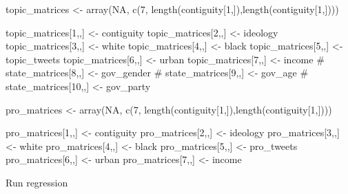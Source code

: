 \documentclass[
  letterpaper,
  DIV=11,
  numbers=noendperiod]{scrartcl}
\newenvironment{Shaded}{\begin{snugshade}}{\end{snugshade}}
\newcommand{\CommentTok}[1]{\textcolor[rgb]{0.37,0.37,0.37}{#1}}
\newcommand{\ConstantTok}[1]{\textcolor[rgb]{0.56,0.35,0.01}{#1}}
\newcommand{\DecValTok}[1]{\textcolor[rgb]{0.68,0.00,0.00}{#1}}
\newcommand{\FunctionTok}[1]{\textcolor[rgb]{0.28,0.35,0.67}{#1}}
\newcommand{\NormalTok}[1]{\textcolor[rgb]{0.00,0.23,0.31}{#1}}
\newcommand{\OtherTok}[1]{\textcolor[rgb]{0.00,0.23,0.31}{#1}}
\begin{document}
\begin{Shaded}
\begin{Highlighting}[]
\NormalTok{topic\_matrices }\OtherTok{\textless{}{-}} \FunctionTok{array}\NormalTok{(}\ConstantTok{NA}\NormalTok{, }\FunctionTok{c}\NormalTok{(}\DecValTok{7}\NormalTok{, }\FunctionTok{length}\NormalTok{(contiguity[}\DecValTok{1}\NormalTok{,]),}\FunctionTok{length}\NormalTok{(contiguity[}\DecValTok{1}\NormalTok{,]))) }


\NormalTok{topic\_matrices[}\DecValTok{1}\NormalTok{,,] }\OtherTok{\textless{}{-}}\NormalTok{ contiguity}
\NormalTok{topic\_matrices[}\DecValTok{2}\NormalTok{,,] }\OtherTok{\textless{}{-}}\NormalTok{ ideology}
\NormalTok{topic\_matrices[}\DecValTok{3}\NormalTok{,,] }\OtherTok{\textless{}{-}}\NormalTok{ white}
\NormalTok{topic\_matrices[}\DecValTok{4}\NormalTok{,,] }\OtherTok{\textless{}{-}}\NormalTok{ black}
\NormalTok{topic\_matrices[}\DecValTok{5}\NormalTok{,,] }\OtherTok{\textless{}{-}}\NormalTok{ topic\_tweets}
\NormalTok{topic\_matrices[}\DecValTok{6}\NormalTok{,,] }\OtherTok{\textless{}{-}}\NormalTok{ urban}
\NormalTok{topic\_matrices[}\DecValTok{7}\NormalTok{,,] }\OtherTok{\textless{}{-}}\NormalTok{ income}
\CommentTok{\# state\_matrices[8,,] \textless{}{-} gov\_gender}
\CommentTok{\# state\_matrices[9,,] \textless{}{-} gov\_age}
\CommentTok{\# state\_matrices[10,,] \textless{}{-} gov\_party}

\NormalTok{pro\_matrices }\OtherTok{\textless{}{-}} \FunctionTok{array}\NormalTok{(}\ConstantTok{NA}\NormalTok{, }\FunctionTok{c}\NormalTok{(}\DecValTok{7}\NormalTok{, }\FunctionTok{length}\NormalTok{(contiguity[}\DecValTok{1}\NormalTok{,]),}\FunctionTok{length}\NormalTok{(contiguity[}\DecValTok{1}\NormalTok{,]))) }


\NormalTok{pro\_matrices[}\DecValTok{1}\NormalTok{,,] }\OtherTok{\textless{}{-}}\NormalTok{ contiguity}
\NormalTok{pro\_matrices[}\DecValTok{2}\NormalTok{,,] }\OtherTok{\textless{}{-}}\NormalTok{ ideology}
\NormalTok{pro\_matrices[}\DecValTok{3}\NormalTok{,,] }\OtherTok{\textless{}{-}}\NormalTok{ white}
\NormalTok{pro\_matrices[}\DecValTok{4}\NormalTok{,,] }\OtherTok{\textless{}{-}}\NormalTok{ black}
\NormalTok{pro\_matrices[}\DecValTok{5}\NormalTok{,,] }\OtherTok{\textless{}{-}}\NormalTok{ pro\_tweets}
\NormalTok{pro\_matrices[}\DecValTok{6}\NormalTok{,,] }\OtherTok{\textless{}{-}}\NormalTok{ urban}
\NormalTok{pro\_matrices[}\DecValTok{7}\NormalTok{,,] }\OtherTok{\textless{}{-}}\NormalTok{ income}
\end{Highlighting}
\end{Shaded}

Run regression
\end{document}
